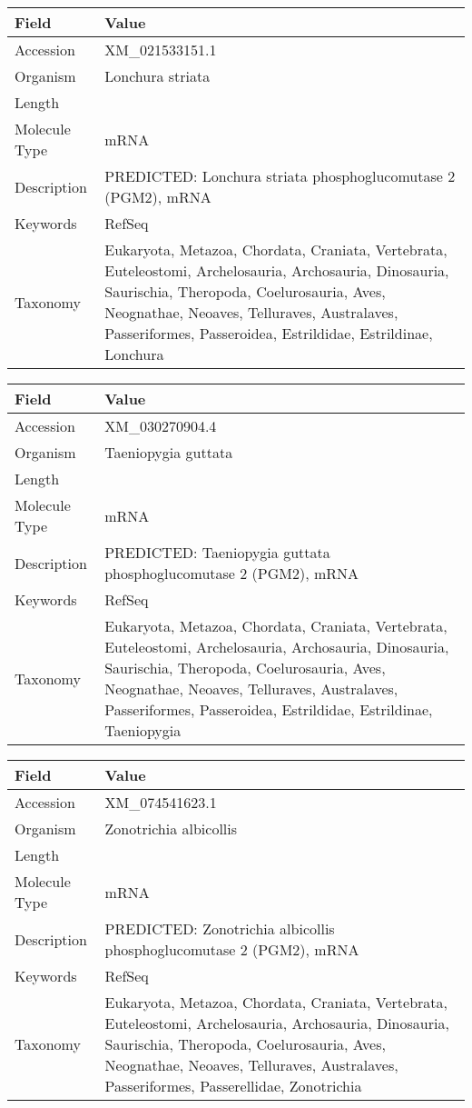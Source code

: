 \documentclass[10pt]{article}
\begin{document}
{\footnotesize
\begin{longtable}{>{\raggedright\arraybackslash}p{4.5cm} >{\raggedright\arraybackslash}p{11.5cm}}
\textbf{Field} & \textbf{Value} \\
\hline
Accession & XM\_021533151.1 \\
Organism & Lonchura striata \\
Length & 5634 \\
Molecule Type & mRNA \\
Description & PREDICTED: Lonchura striata phosphoglucomutase 2 (PGM2), mRNA \\
Keywords & RefSeq \\
Taxonomy & Eukaryota, Metazoa, Chordata, Craniata, Vertebrata, Euteleostomi, Archelosauria, Archosauria, Dinosauria, Saurischia, Theropoda, Coelurosauria, Aves, Neognathae, Neoaves, Telluraves, Australaves, Passeriformes, Passeroidea, Estrildidae, Estrildinae, Lonchura \\
\end{longtable}
}

{\footnotesize
\begin{longtable}{>{\raggedright\arraybackslash}p{4.5cm} >{\raggedright\arraybackslash}p{11.5cm}}
\textbf{Field} & \textbf{Value} \\
\hline
Accession & XM\_030270904.4 \\
Organism & Taeniopygia guttata \\
Length & 2173 \\
Molecule Type & mRNA \\
Description & PREDICTED: Taeniopygia guttata phosphoglucomutase 2 (PGM2), mRNA \\
Keywords & RefSeq \\
Taxonomy & Eukaryota, Metazoa, Chordata, Craniata, Vertebrata, Euteleostomi, Archelosauria, Archosauria, Dinosauria, Saurischia, Theropoda, Coelurosauria, Aves, Neognathae, Neoaves, Telluraves, Australaves, Passeriformes, Passeroidea, Estrildidae, Estrildinae, Taeniopygia \\
\end{longtable}
}

{\footnotesize
\begin{longtable}{>{\raggedright\arraybackslash}p{4.5cm} >{\raggedright\arraybackslash}p{11.5cm}}
\textbf{Field} & \textbf{Value} \\
\hline
Accession & XM\_074541623.1 \\
Organism & Zonotrichia albicollis \\
Length & 2221 \\
Molecule Type & mRNA \\
Description & PREDICTED: Zonotrichia albicollis phosphoglucomutase 2 (PGM2), mRNA \\
Keywords & RefSeq \\
Taxonomy & Eukaryota, Metazoa, Chordata, Craniata, Vertebrata, Euteleostomi, Archelosauria, Archosauria, Dinosauria, Saurischia, Theropoda, Coelurosauria, Aves, Neognathae, Neoaves, Telluraves, Australaves, Passeriformes, Passerellidae, Zonotrichia \\
\end{longtable}
}
\end{document}
